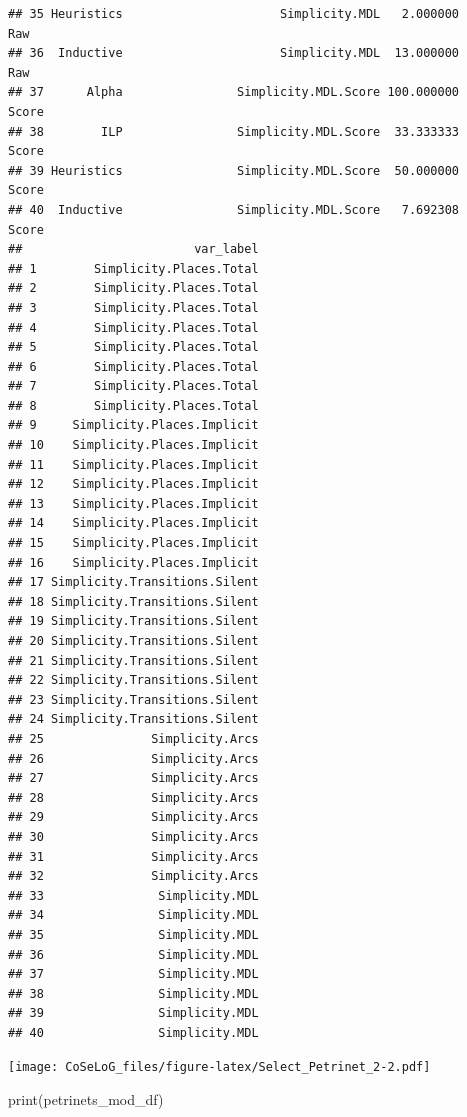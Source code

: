 \documentclass[]{article}
\newenvironment{Shaded}{\begin{snugshade}}{\end{snugshade}}
\newcommand{\KeywordTok}[1]{\textcolor[rgb]{0.94,0.87,0.69}{{#1}}}
\newcommand{\NormalTok}[1]{\textcolor[rgb]{0.80,0.80,0.80}{{#1}}}
\begin{document}
\begin{verbatim}
## 35 Heuristics                      Simplicity.MDL   2.000000      Raw
## 36  Inductive                      Simplicity.MDL  13.000000      Raw
## 37      Alpha                Simplicity.MDL.Score 100.000000    Score
## 38        ILP                Simplicity.MDL.Score  33.333333    Score
## 39 Heuristics                Simplicity.MDL.Score  50.000000    Score
## 40  Inductive                Simplicity.MDL.Score   7.692308    Score
##                        var_label
## 1        Simplicity.Places.Total
## 2        Simplicity.Places.Total
## 3        Simplicity.Places.Total
## 4        Simplicity.Places.Total
## 5        Simplicity.Places.Total
## 6        Simplicity.Places.Total
## 7        Simplicity.Places.Total
## 8        Simplicity.Places.Total
## 9     Simplicity.Places.Implicit
## 10    Simplicity.Places.Implicit
## 11    Simplicity.Places.Implicit
## 12    Simplicity.Places.Implicit
## 13    Simplicity.Places.Implicit
## 14    Simplicity.Places.Implicit
## 15    Simplicity.Places.Implicit
## 16    Simplicity.Places.Implicit
## 17 Simplicity.Transitions.Silent
## 18 Simplicity.Transitions.Silent
## 19 Simplicity.Transitions.Silent
## 20 Simplicity.Transitions.Silent
## 21 Simplicity.Transitions.Silent
## 22 Simplicity.Transitions.Silent
## 23 Simplicity.Transitions.Silent
## 24 Simplicity.Transitions.Silent
## 25               Simplicity.Arcs
## 26               Simplicity.Arcs
## 27               Simplicity.Arcs
## 28               Simplicity.Arcs
## 29               Simplicity.Arcs
## 30               Simplicity.Arcs
## 31               Simplicity.Arcs
## 32               Simplicity.Arcs
## 33                Simplicity.MDL
## 34                Simplicity.MDL
## 35                Simplicity.MDL
## 36                Simplicity.MDL
## 37                Simplicity.MDL
## 38                Simplicity.MDL
## 39                Simplicity.MDL
## 40                Simplicity.MDL
\end{verbatim}

\texttt{[image: CoSeLoG\_files/figure-latex/Select\_Petrinet\_2-2.pdf]}

\begin{Shaded}
\begin{Highlighting}[]
\KeywordTok{print}\NormalTok{(petrinets_mod_df)}
\end{Highlighting}
\end{Shaded}
\end{document}
